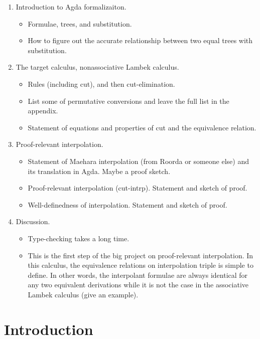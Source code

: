 \documentclass[runningheads]{llncs}
\begin{document}
\begin{enumerate}
  \item Introduction to Agda formalizaiton.
  \begin{itemize}
    \item Formulae, trees, and substitution.
    \item How to figure out the accurate relationship between two equal trees with substitution.
  \end{itemize}
  \item The target calculus, nonassociative Lambek calculus.
  \begin{itemize}
    \item Rules (including cut), and then cut-elimination.
    \item List some of permutative conversions and leave the full list in the appendix.
    \item Statement of equations and properties of cut and the equivalence relation.
  \end{itemize}
  \item Proof-relevant interpolation.
  \begin{itemize}
    \item Statement of Maehara interpolation (from Roorda or someone else) and its translation in Agda. Maybe a proof sketch.
    \item Proof-relevant interpolation (cut-intrp). Statement and sketch of proof.
    \item Well-definedness of interpolation. Statement and sketch of proof.
  \end{itemize}
  \item Discussion.
  \begin{itemize}
    \item Type-checking takes a long time.
    \item This is the first step of the big project on proof-relevant interpolation. In this calculus, the equivalence relations on interpolation triple is simple to define. In other words, the interpolant formulae are always identical for any two equivalent derivations while it is not the case in the associative Lambek calculus (give an example).
  \end{itemize}
\end{enumerate}

\section{Introduction}
\end{document}
